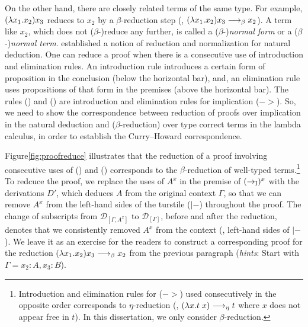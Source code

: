 On the other hand, there are closely related terms of the same type.
For example, $(\lambda x_1.x_2) x_3$ reduces to $x_2$ by a $\beta$-reduction step
(\ie, $(\lambda x_1.x_2) x_3 -->_\beta x_2$). A term like $x_2$, which does not
($\beta$-)reduce any further, is called a ($\beta$-)\emph{normal form} or
a ($\beta$-)\emph{normal term}. \citet{Pra65} established a notion of
reduction and normalization for natural deduction. One can reduce a proof
when there is a consecutive use of introduction and elimination rules.
An introduction rule introduces a certain form of proposition
in the conclusion (below the horizontal bar), and, an elimination rule
uses propositions of that form in the premises (above the horizontal bar).
The rules () and ()
are introduction and elimination rules for implication ($->$).
So, we need to show the correspondence between reduction of proofs
over implication in the natural deduction and ($\beta$-reduction) over
type correct terms in the lambda calculus,
in order to establish the Curry--Howard correspondence.

Figure\;\ref{fig:proofreduce} illustrates that
the reduction of a proof involving consecutive uses of
() and ()
corresponds to the $\beta$-reduction of well-typed terms.\footnote{
        Introduction and elimination rules for ($->$) used consecutively
        in the opposite order corresponds to $\eta$-reduction
        (\ie, $(\lambda x. t\;x) -->_\eta t$ where $x$ does not appear free in $t$).
        In this dissertation, we only consider $\beta$-reduction.}
To redcuce the proof, we replace the uses of $A^x$ in the premise of
$(->_\textsc{I})^x$ with the derivations $D'$, which deduces $A$ from
the original context $\Gamma$, so that we can remove $A^x$ from
the left-hand sides of the turstile ($|-$) throughout the proof.
The change of subscripts from $\mathcal{D}_{[\Gamma,A^x]}$ to
$\mathcal{D}_{[\Gamma]}$, before and after the reduction,
denotes that we consistently removed $A^x$ from the context
(\ie, left-hand sides of $|-$). We leave it as an exercise for
the readers to construct a corresponding proof for the reduction
$(\lambda x_1.x_2) x_3 -->_\beta x_2$ from the previous paragraph
(\textit{hints}: Start with $\Gamma = x_2:A,x_3:B$).

